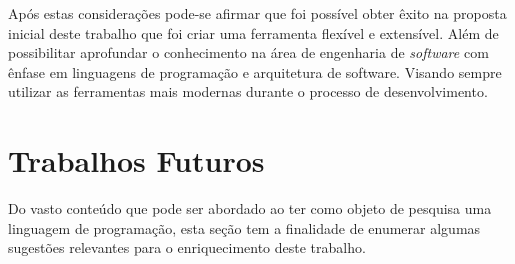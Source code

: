Ap\'{o}s estas considera\c{c}\~{o}es pode-se afirmar que foi poss\'{i}vel obter \^{e}xito na proposta inicial deste trabalho que foi criar uma ferramenta flex\'{i}vel e extens\'{i}vel. Al\'{e}m  de possibilitar aprofundar o conhecimento na \'{a}rea de engenharia de \textit{software} com \^{e}nfase em linguagens de programa\c{c}\~{a}o e arquitetura de software. Visando sempre utilizar as ferramentas mais modernas durante o processo de desenvolvimento.





\section{Trabalhos Futuros}
Do vasto conte\'{u}do que pode ser abordado ao ter como objeto de pesquisa uma linguagem de programa\c{c}\~{a}o,  esta se\c{c}\~{a}o tem a finalidade de enumerar algumas sugest\~{o}es relevantes para o enriquecimento deste trabalho.


